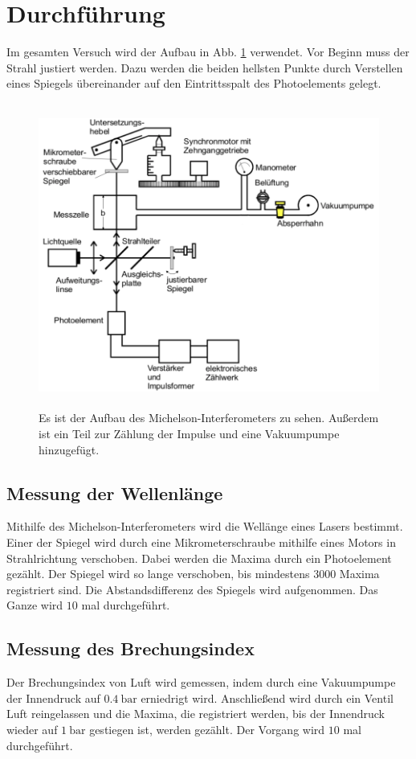 \section{Durchführung}
\label{sec:Durchführung}
Im gesamten Versuch wird der Aufbau in Abb. \ref{fig:aufbau} verwendet.
\newline
Vor Beginn muss der Strahl justiert werden. Dazu werden die beiden hellsten
Punkte durch Verstellen eines Spiegels übereinander auf den Eintrittsspalt des 
Photoelements gelegt.

\begin{figure}
    \centering
    \includegraphics[width=12cm, height=10cm]{build/aufbau.png}
    \caption{Es ist der Aufbau des Michelson-Interferometers zu sehen.
    Außerdem ist ein Teil zur Zählung der Impulse und eine Vakuumpumpe
    hinzugefügt. \cite{V401}}
    \label{fig:aufbau}
\end{figure}

\subsection{Messung der Wellenlänge}
Mithilfe des Michelson-Interferometers wird die Wellänge eines Lasers bestimmt.
Einer der Spiegel wird durch eine Mikrometerschraube mithilfe eines Motors in 
Strahlrichtung verschoben. Dabei werden die Maxima durch ein Photoelement gezählt.
Der Spiegel wird so lange verschoben, bis mindestens $\num{3000}$ Maxima registriert
sind. Die Abstandsdifferenz des Spiegels wird aufgenommen. Das Ganze wird $\num{10}$ mal durchgeführt.

\subsection{Messung des Brechungsindex}
Der Brechungsindex von Luft wird gemessen, indem durch eine Vakuumpumpe der Innendruck
auf $\SI{0.4}{\bar}$ erniedrigt wird. Anschließend wird durch ein Ventil Luft
reingelassen und die Maxima, die registriert werden, bis der Innendruck wieder auf
$\SI{1}{\bar}$ gestiegen ist, werden gezählt. Der Vorgang wird $\num{10}$ mal durchgeführt.